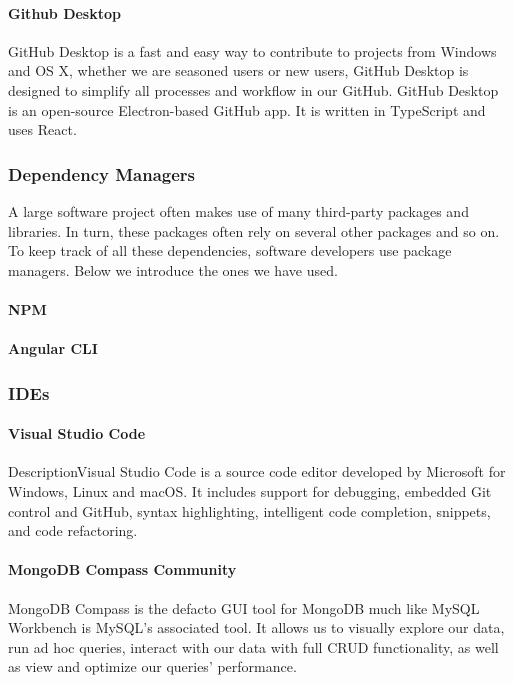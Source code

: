 \paragraph{Github Desktop}
GitHub Desktop is a fast and easy way to contribute to projects from Windows and OS X, whether we are seasoned users or new users, GitHub Desktop is designed to simplify all processes and workflow in our GitHub. GitHub Desktop is an open-source Electron-based GitHub app. It is written in TypeScript and uses React.


\subsubsection{Dependency Managers}
A large software project often makes use of many third-party packages and libraries. In turn, these packages
often rely on several other packages and so on. To keep track of all these dependencies, software developers
use package managers. Below we introduce the ones we have used.
\paragraph{NPM}
\paragraph{Angular CLI}

\subsubsection{IDEs}

\paragraph{Visual Studio Code}
DescriptionVisual Studio Code is a source code editor developed by Microsoft for Windows, Linux and macOS. It includes support for debugging, embedded Git control and GitHub, syntax highlighting, intelligent code completion, snippets, and code refactoring.


\paragraph{MongoDB Compass Community}
MongoDB Compass is the defacto GUI tool for MongoDB much like MySQL Workbench is MySQL’s associated tool. It allows us to visually explore our data, run ad hoc queries, interact with our data with full CRUD functionality, as well as view and optimize our queries’ performance.


